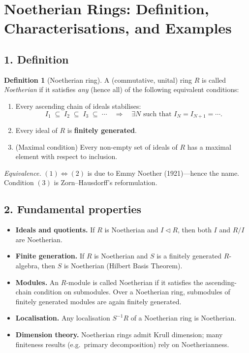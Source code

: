 \documentclass[12pt]{article}
\theoremstyle{definition} %
\newtheorem{definition}{Definition}
\theoremstyle{plain} %
\begin{document}
\section*{Noetherian Rings: Definition, Characterisations, and Examples}

\subsection*{1.  Definition}

\begin{definition}[Noetherian ring]
A (commutative, unital) ring \(R\) is called \emph{Noetherian} if it
satisfies \emph{any} (hence all) of the following equivalent
conditions:
\begin{enumerate}
   \item Every ascending chain of ideals stabilises:
         \[
            I_1 \;\subseteq\; I_2 \;\subseteq\; I_3 \;\subseteq\;\cdots
         \quad\Longrightarrow\quad
            \exists N \text{ such that } I_N = I_{N+1} = \cdots.
         \]
   \item Every ideal of \(R\) is \textbf{finitely generated}.
   \item (Maximal condition) Every non-empty set of ideals of \(R\)
         has a maximal element with respect to inclusion.
\end{enumerate}
\end{definition}

\emph{Equivalence.}  
\((1)\!\iff(2)\) is due to Emmy Noether (1921)---hence the name.
Condition \((3)\) is Zorn–Hausdorff’s reformulation.

\subsection*{2.  Fundamental properties}

\begin{itemize}
   \item \textbf{Ideals and quotients.}
         If \(R\) is Noetherian and \(I\lhd R\), then both \(I\) and
         \(R/I\) are Noetherian.

   \item \textbf{Finite generation.}
         If \(R\) is Noetherian and \(S\) is a finitely generated
         \(R\)-algebra, then \(S\) is Noetherian
         (Hilbert Basis Theorem).

   \item \textbf{Modules.}
         An \(R\)-module is called Noetherian if it satisfies the
         ascending-chain condition on submodules.  Over a Noetherian
         ring, submodules of finitely generated modules are again
         finitely generated.

   \item \textbf{Localisation.}
         Any localisation \(S^{-1}R\) of a Noetherian ring is
         Noetherian.

   \item \textbf{Dimension theory.}
         Noetherian rings admit Krull dimension; many finiteness
         results (e.g.\ primary decomposition) rely on Noetherianness.
\end{itemize}
\end{document}
